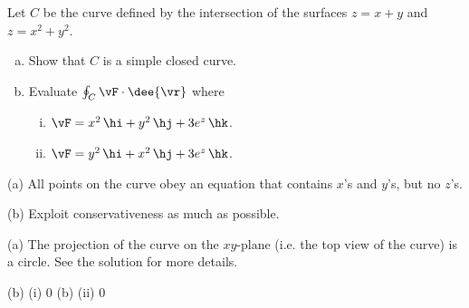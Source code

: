 \begin{question}[M317 2010A] %
Let $C$ be the curve defined by the intersection of the surfaces
$z = x + y$ and $z = x^2 + y^2$.
\begin{enumerate}[(a)]
\item
Show that $C$ is a simple closed curve.
\item
Evaluate $\oint_C \vF \cdot \dee{\vr}$ where
\begin{enumerate}[(i)]
\item
 $\vF = x^2\,\hi + y^2\,\hj + 3 e^z\,\hk$.
\item
  $\vF = y^2\,\hi + x^2\,\hj + 3 e^z\,\hk$.
\end{enumerate}
\end{enumerate}
\end{question}

\begin{hint}
(a) All points on the curve obey an equation that contains $x$'s and $y$'s,
but no $z$'s.

(b) Exploit conservativeness as much as possible.
\end{hint}

\begin{answer}
(a) The projection of the curve on the $xy$-plane (i.e. the top view of the curve) is a circle. See the solution for more details.

(b) (i) $0$\qquad
(b) (ii) $0$
\end{answer}

